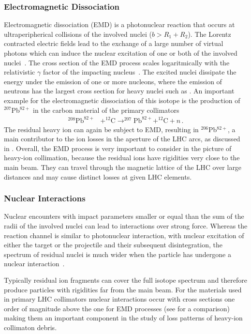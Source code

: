 \subsubsection{Electromagnetic Dissociation} \label{chap:emd}
Electromagnetic dissociation (EMD) is a photonuclear reaction that occurs at ultraperipherical collisions of the involved nuclei \mbox{($b>R_1 + R_2$)}. The Lorentz contracted electric fields lead to the exchange of a large number of virtual photons which can induce the nuclear excitation of one or both of the involved nuclei~\cite{PhysRevSTAB17021006}. The cross section of the EMD process scales logaritmically with the relativistic $\gamma$ factor of the impacting nucleus~\cite{PhysRevSTAB17021006}. The excited nuclei dissipate the energy under the emission of one or more nucleons, where the emission of neutrons has the largest cross section for heavy nuclei such as \lead. An important example for the electromagnetic dissociation of this isotope is the production of $^{207}$Pb$^{82+}$ in the carbon material of the primary collimators 
\begin{align}
^{208}\text{Pb}^{82+} &+ ^{12}\text{C} \rightarrow ^{207}\text{Pb}^{82+}  + ^{12}\text{C} + n \, .
\end{align}
The residual heavy ion can again be subject to EMD, resulting in $^{206}$Pb$^{82+}$, a main contributor to the ion losses in the aperture of the LHC arcs, as discussed in . Overall, the EMD process is very important to consider in the picture of heavy-ion collimation, because the residual ions have rigidities very close to the main beam. They can travel through the magnetic lattice of the LHC over large distances and may cause distinct losses at given LHC elements. 

\subsubsection{Nuclear Interactions}
Nuclear encounters with impact parameters smaller or equal than the sum of the radii of the involved nuclei can lead to interactions over strong force. Whereas the reaction channel is similar to photonuclear interaction, with nuclear excitation of either the target or the projectile and their subsequent disintegration, the spectrum of residual nuclei is much wider when the particle has undergone a nuclear interaction~\cite{bartke:relativistic}. 

Typically residual ion fragments can cover the full isotope spectrum and therefore produce particles with rigidities far from the main beam. For the materials used in primary LHC collimators nuclear interactions occur with cross sections one order of magnitude above the one for EMD processes (see  for a comparison) making them an important component in the study of loss patterns of heavy-ion collimaton debris.

